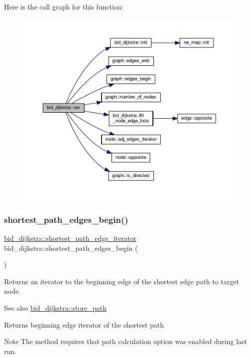 Here is the call graph for this function\+:\nopagebreak
\begin{figure}[H]
\begin{center}
\leavevmode
\includegraphics[width=350pt]{classbid__dijkstra_a1d2f36d3977ef90285442a269a03b919_cgraph}
\end{center}
\end{figure}
\mbox{\label{classbid__dijkstra_a177bf7ffd4bf83ce364076ab5183dc3e}} 
\subsubsection{\texorpdfstring{shortest\+\_\+path\+\_\+edges\+\_\+begin()}{shortest\_path\_edges\_begin()}}
{\footnotesize\ttfamily \mbox{\hyperlink{classbid__dijkstra_a12c551a4f2fea9d38d2b6488278e3a09}{bid\+\_\+dijkstra\+::shortest\+\_\+path\+\_\+edge\+\_\+iterator}} bid\+\_\+dijkstra\+::shortest\+\_\+path\+\_\+edges\+\_\+begin (\begin{DoxyParamCaption}{ }\end{DoxyParamCaption})}



Returns an iterator to the beginning edge of the shortest edge path to target node. 

\begin{DoxySeeAlso}{See also}
\mbox{\hyperlink{classbid__dijkstra_a0032d9b44c8b3f6f5733ff3ef94cf169}{bid\+\_\+dijkstra\+::store\+\_\+path}}
\end{DoxySeeAlso}
\begin{DoxyReturn}{Returns}
beginning edge iterator of the shortest path
\end{DoxyReturn}
\begin{DoxyNote}{Note}
The method requires that path calculation option was enabled during last run. 
\end{DoxyNote}



